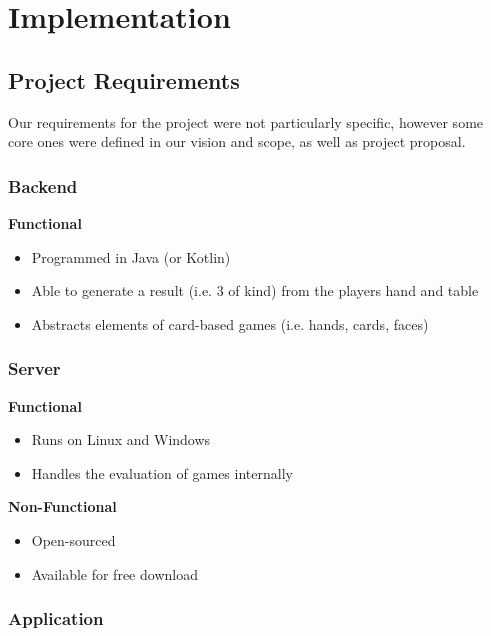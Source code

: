 \documentclass[11pt]{article}
\begin{document}
\newpage
\section{Implementation}

\subsection{Project Requirements}
Our requirements for the project were not particularly specific, however some core ones were defined in our vision and scope, as well as project proposal. 

\subsubsection{Backend}
\textbf{Functional}
\begin{itemize}
	\item Programmed in Java (or Kotlin)
	\item Able to generate a result (i.e. 3 of kind) from the players hand and table
	\item Abstracts elements of card-based games (i.e. hands, cards, faces)
\end{itemize}

\subsubsection{Server}
\textbf{Functional}
\begin{itemize}
	\item Runs on Linux and Windows
	\item Handles the evaluation of games internally
\end{itemize}

\textbf{Non-Functional}
\begin{itemize}
	\item Open-sourced
	\item Available for free download
\end{itemize}

\subsubsection{Application}
\end{document}
